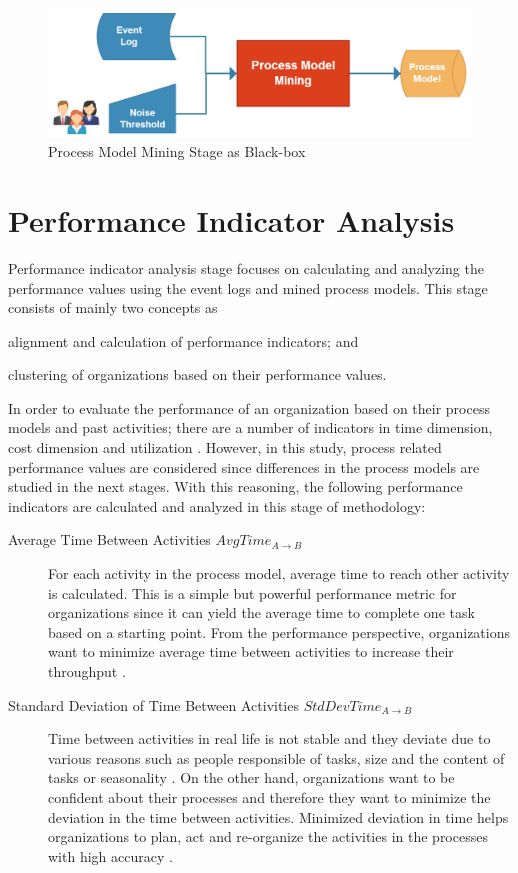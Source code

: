 \begin{figure}
  \centering
  \includegraphics[width=\textwidth]{4_methodology/process-model-mining-blackbox}
  \caption{Process Model Mining Stage as Black-box }
  \label{fig:process-model-mining-blackbox}
\end{figure}


\section{Performance Indicator Analysis}
\label{sec:performance-indicator-analysis}
Performance indicator analysis stage focuses on calculating and analyzing the performance values using the event logs and mined process models. This stage consists of mainly two concepts as 
\begin{inparaenum}
\item alignment and calculation of performance indicators; and
\item clustering of organizations based on their performance values.
\end{inparaenum}
In order to evaluate the performance of an organization based on their process models and past activities; there are a number of indicators in time dimension, cost dimension and utilization \cite{van2011process}. However, in this study, process related performance values are considered since differences in the process models are studied in the next stages. With this reasoning, the following performance indicators are calculated and analyzed in this stage of methodology:
\begin{description}
  \item[Average Time Between Activities $AvgTime_{A\rightarrow B}$] For each activity in the process model, average time to reach other activity is calculated. This is a simple but powerful performance metric for organizations since it can yield the average time to complete one task based on a starting point. From the performance perspective, organizations want to minimize average time between activities to increase their throughput \cite{van2012replaying}.
  \item[Standard Deviation of Time Between Activities $StdDevTime_{A\rightarrow B}$] Time between activities in real life is not stable and they deviate due to various reasons such as people responsible of tasks, size and the content of tasks or seasonality \cite{van2011process}. On the other hand, organizations want to be confident about their processes and therefore they want to minimize the deviation in the time between activities. Minimized deviation in time helps organizations to plan, act and re-organize the activities in the processes with high accuracy \cite{van2012replaying}.
\end{description}
